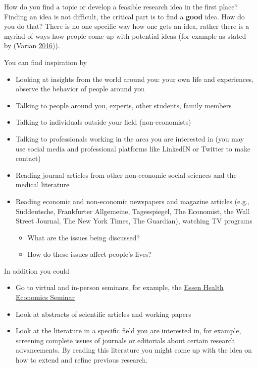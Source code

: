 \documentclass[
]{book}
\providecommand{\tightlist}{%
  \setlength{\itemsep}{0pt}\setlength{\parskip}{0pt}}
\begin{document}
How do you find a topic or develop a feasible research idea in the first
place? Finding an idea is not difficult, the critical part is to find a
\textbf{good} idea. How do you do that? There is no one specific way how
one gets an idea, rather there is a myriad of ways how people come up
with potential ideas (for example as stated by (Varian
\protect\hyperlink{ref-varian_how_2016}{2016})).

You can find inspiration by

\begin{itemize}
\tightlist
\item
  Looking at insights from the world around you: your own life and
  experiences, observe the behavior of people around you
\item
  Talking to people around you, experts, other students, family members
\item
  Talking to individuals outside your field (non-economists)
\item
  Talking to professionals working in the area you are interested in
  (you may use social media and professional platforms like LinkedIN or
  Twitter to make contact)
\item
  Reading journal articles from other non-economic social sciences and
  the medical literature
\item
  Reading economic and non-economic newspapers and magazine articles
  (e.g., Süddeutsche, Frankfurter Allgemeine, Tagesspiegel, The
  Economist, the Wall Street Journal, The New York Times, The Guardian),
  watching TV programs

  \begin{itemize}
  \tightlist
  \item
    What are the issues being discussed?
  \item
    How do these issues affect people's lives?
  \end{itemize}
\end{itemize}

In addition you could

\begin{itemize}
\tightlist
\item
  Go to virtual and in-person seminars, for example, the
  \href{https://www.goek.wiwi.uni-due.de/forschung/essen-health-economics-seminar/winter-2020-21/}{Essen
  Health Economics Seminar}
\item
  Look at abstracts of scientific articles and working papers
\item
  Look at the literature in a specific field you are interested in, for
  example, screening complete issues of journals or editorials about
  certain research advancements. By reading this literature you might
  come up with the idea on how to extend and refine previous research.
\end{itemize}
\end{document}
